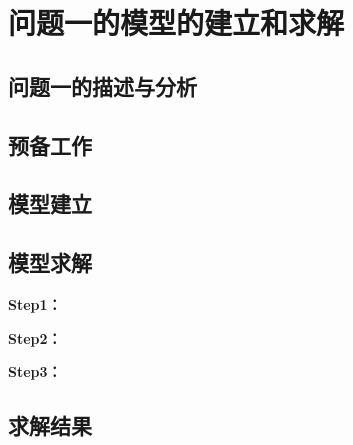 \section{问题一的模型的建立和求解}
\subsection{问题一的描述与分析}

\subsection{预备工作}

\subsection{模型建立}

\subsection{模型求解}

\textbf{Step1：} 

\textbf{Step2：} 

\textbf{Step3：} 

\subsection{求解结果}